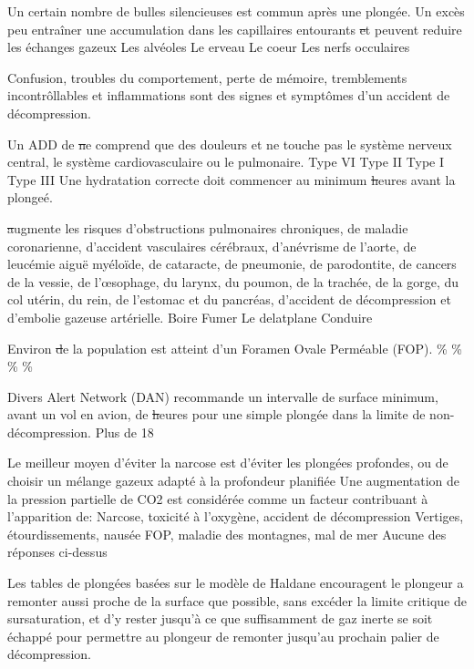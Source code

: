 \documentclass[english,10pt,twoside]{article}
\begin{document}
\begin{outline}
		\1 Un certain nombre de bulles silencieuses est commun après une plongée. Un excès peu entraîner une accumulation dans les capillaires entourants \st et peuvent reduire les échanges gazeux
			\2 Les alvéoles
			\2 Le erveau
			\2 Le coeur
			\2 Les nerfs occulaires

		\1 Confusion, troubles du comportement, perte de mémoire, tremblements incontrôllables et inflammations sont des signes et symptômes d'un accident de décompression.\vf

		\1 Un ADD de \st ne comprend que des douleurs et ne touche pas le système nerveux central, le système cardiovasculaire ou le pulmonaire.
			\2 Type VI
			\2 Type II
			\2 Type I
			\2 Type III
		\1 Une hydratation correcte doit commencer au minimum	\st heures avant la plongeé.

		\1 \st augmente les risques d'obstructions pulmonaires chroniques, de maladie coronarienne, d'accident vasculaires cérébraux, d'anévrisme de l'aorte, de leucémie aiguë myéloïde, de cataracte, de pneumonie, de parodontite, de cancers de la vessie, de l'œsophage, du larynx, du poumon, de la trachée, de la gorge, du col utérin, du rein, de l'estomac et du pancréas, d'accident de décompression et d'embolie gazeuse artérielle.
			\2 Boire
			\2 Fumer
			\2 Le delatplane
			\2 Conduire

		\1 Environ \st de la population est atteint d'un Foramen Ovale Perméable (FOP).
			\%
			\%
			\%
			\%

		\1 Divers Alert Network (DAN) recommande un intervalle de surface minimum, avant un vol en avion, de \st heures pour une simple plongée dans la limite de non-décompression.
			\2 Plus de 18
			\2 18

		\1 Le meilleur moyen d'éviter la narcose est d'éviter les plongées profondes, ou de choisir un mélange gazeux adapté à la profondeur planifiée\vf	
		\1 Une augmentation de la pression partielle de CO2 est considérée comme un facteur contribuant à l'apparition de:
			\2 Narcose, toxicité à l'oxygène, accident de décompression
			\2 Vertiges, étourdissements, nausée
			\2 FOP, maladie des montagnes, mal de mer
			\2 Aucune des réponses ci-dessus

		\1 Les tables de plongées basées sur le modèle de Haldane encouragent le plongeur a remonter aussi proche de la surface que possible, sans excéder la limite critique de sursaturation, et d'y rester jusqu'à ce que suffisamment de gaz inerte se soit échappé pour permettre au plongeur de remonter jusqu'au prochain palier de décompression.\vf



\end{outline}
\end{document}
